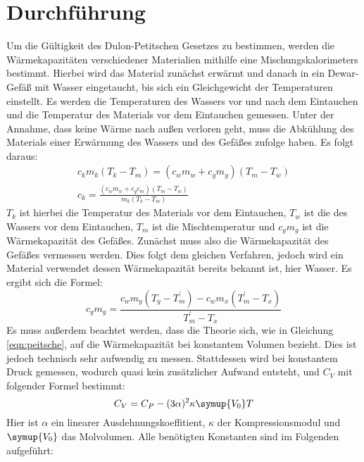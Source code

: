 \section{Durchführung}
\label{sec:Durchführung}
Um die Gültigkeit des Dulon-Petitschen Gesetzes zu bestimmen, werden die Wärmekapazitäten verschiedener Materialien
mithilfe eine Mischungskalorimeters bestimmt.
Hierbei wird das Material zunächst erwärmt und danach in ein Dewar-Gefäß mit Wasser eingetaucht,
bis sich ein Gleichgewicht der Temperaturen einstellt.
Es werden die Temperaturen des Wassers vor und nach dem Eintauchen und die Temperatur des Materials vor dem Eintauchen gemessen.
Unter der Annahme, dass keine Wärme nach außen verloren geht,
muss die Abkühlung des Materials einer Erwärmung des Wassers und des Gefäßes zufolge haben.
Es folgt daraus:
\begin{gather}
    c_km_k(T_k-T_m) = (c_wm_w + c_gm_g)(T_m - T_w) \\
    c_k = \frac{(c_wm_w + c_gc_m)(T_m - T_w)}{m_k(T_k - T_m)}
\end{gather}
$T_k$ ist hierbei die Temperatur des Materials vor dem Eintauchen, $T_w$ ist die des Wassers vor dem Eintauchen,
$T_m$ ist die Mischtemperatur und $c_gm_g$ ist die Wärmekapazität des Gefäßes.
Zunächst muss also die Wärmekapazität des Gefäßes vermessen werden. Dies folgt dem gleichen Verfahren, jedoch wird ein Material verwendet
dessen Wärmekapazität bereits bekannt ist, hier Wasser.
Es ergibt sich die Formel:
\begin{equation}
    \label{eqn:gefaess}
    c_gm_g = \frac{c_wm_y\left(T_y - T^{\prime}_m\right) - c_wm_x\left(T^{\prime}_m - T_x\right)}{T^{\prime}_m - T_x}
\end{equation}
Es muss außerdem beachtet werden, dass die Theorie sich, wie in Gleichung \eqref{eqn:peitsche},
auf die Wärmekapazität bei konstantem Volumen bezieht.
Dies ist jedoch technisch sehr aufwendig zu messen. Stattdessen wird bei konstantem Druck gemessen,
wodurch quasi kein zusätzlicher Aufwand entsteht, und $C_V$ mit folgender Formel bestimmt:
\begin{equation}
  \label{eqn:dubbi}
    C_V = C_P - (3\alpha)^2\kappa\symup{V_0}T
\end{equation}
Hier ist $\alpha$ ein linearer Ausdehnungskoeffitient, $\kappa$ der Kompressionsmodul und $\symup{V_0}$ das Molvolumen.
Alle benötigten Konstanten sind im Folgenden aufgeführt:
